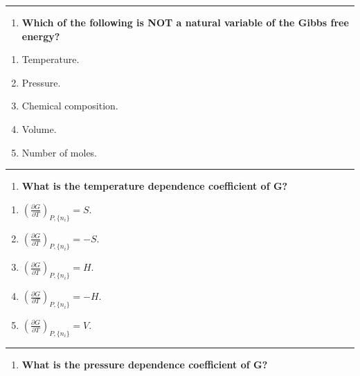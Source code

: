 \documentclass[
  9pt,
]{extbook}
\providecommand{\tightlist}{%
  \setlength{\itemsep}{0pt}\setlength{\parskip}{0pt}}
\theoremstyle{definition}
\theoremstyle{definition}
\theoremstyle{definition}
\theoremstyle{definition}
\theoremstyle{remark}
\begin{document}
\begin{center}\rule{0.5\linewidth}{0.5pt}\end{center}

\begin{enumerate}
\def\labelenumi{\arabic{enumi}.}
\setcounter{enumi}{2}
\tightlist
\item
  \textbf{Which of the following is NOT a natural variable of the Gibbs free energy?}
\end{enumerate}

\begin{enumerate}
\def\labelenumi{\alph{enumi}.}
\tightlist
\item
  Temperature.
\item
  Pressure.
\item
  Chemical composition.
\item
  Volume.
\item
  Number of moles.
\end{enumerate}

\begin{center}\rule{0.5\linewidth}{0.5pt}\end{center}

\begin{enumerate}
\def\labelenumi{\arabic{enumi}.}
\setcounter{enumi}{3}
\tightlist
\item
  \textbf{What is the temperature dependence coefficient of G?}
\end{enumerate}

\begin{enumerate}
\def\labelenumi{\alph{enumi}.}
\tightlist
\item
  \(\left(\frac{\partial G}{\partial T}\right)_{P,\{n_i\}} = S\).
\item
  \(\left(\frac{\partial G}{\partial T}\right)_{P,\{n_i\}} = -S\).
\item
  \(\left(\frac{\partial G}{\partial T}\right)_{P,\{n_i\}} = H\).
\item
  \(\left(\frac{\partial G}{\partial T}\right)_{P,\{n_i\}} = -H\).
\item
  \(\left(\frac{\partial G}{\partial T}\right)_{P,\{n_i\}} = V\).
\end{enumerate}

\begin{center}\rule{0.5\linewidth}{0.5pt}\end{center}

\begin{enumerate}
\def\labelenumi{\arabic{enumi}.}
\setcounter{enumi}{4}
\tightlist
\item
  \textbf{What is the pressure dependence coefficient of G?}
\end{enumerate}
\end{document}
